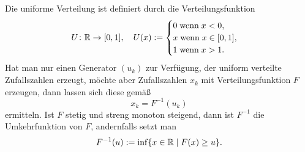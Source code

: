 Die uniforme Verteilung ist definiert durch die Verteilungsfunktion
\begin{equation}
U\colon\mathbb R\to [0,1],\quad U(x):=\begin{cases}
0\;\text{wenn}\;x<0,\\
x\;\text{wenn}\;x\in [0,1],\\
1\;\text{wenn}\;x>1.
\end{cases}
\end{equation}
Hat man nur einen Generator $(u_k)$ zur Verfügung, der uniform
verteilte Zufallszahlen erzeugt, möchte aber Zufallszahlen $x_k$
mit Verteilungsfunktion $F$ erzeugen, dann lassen sich diese
gemäß
\begin{equation}
x_k = F^{-1}(u_k)
\end{equation}
ermitteln. Ist $F$ stetig und streng monoton steigend, dann
ist $F^{-1}$ die Umkehrfunktion von $F$, andernfalls setzt man
\begin{equation}
F^{-1}(u) := \inf\{x\in\mathbb R\mid F(x)\ge u\}.
\end{equation}


